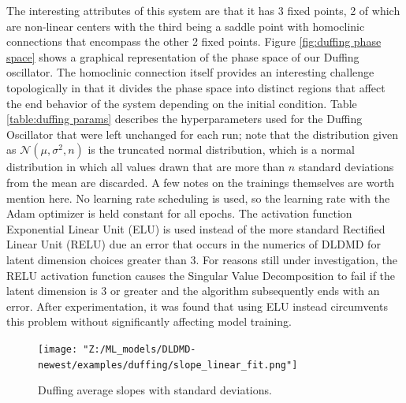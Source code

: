 The interesting attributes of this system are that it has 3 fixed points, 2 of which are non-linear 
centers with the third being a saddle point with homoclinic connections that encompass the other 2 fixed 
points. Figure \ref{fig:duffing phase space} shows a graphical representation of the phase space of our 
Duffing oscillator. The homoclinic connection itself provides an interesting challenge topologically in 
that it divides the phase space into distinct regions that affect the end behavior of the system depending
on the initial condition. Table \ref{table:duffing params} describes the hyperparameters used for the 
Duffing Oscillator that were left unchanged for each run; note that the distribution given as 
$\mathcal{N}(\mu, \sigma^2, n)$ is the truncated normal distribution, which is a normal distribution
in which all values drawn that are more than $n$ standard deviations from the mean are discarded. 
A few notes on the trainings themselves are worth mention here. No learning rate scheduling is used,
so the learning rate with the Adam optimizer is held constant for all epochs. The activation function
Exponential Linear Unit (ELU) is used instead of the more standard Rectified Linear Unit (RELU) due an 
error that occurs in the numerics of DLDMD for latent dimension choices greater than 3. For reasons still 
under investigation, the RELU activation function causes the Singular Value Decomposition to fail if the 
latent dimension is 3 or greater and the algorithm subsequently ends with an error. After experimentation, 
it was found that using ELU instead circumvents this problem without significantly affecting model training.

\begin{figure}[ht]
    \centering
    \begin{minipage}{\textwidth}
        \texttt{[image: "Z:/ML\_models/DLDMD-newest/examples/duffing/slope\_linear\_fit.png"]} 
    \end{minipage}%
    \caption{Duffing average slopes with standard deviations.}
    \label{fig:duffing average slopes}
\end{figure}

